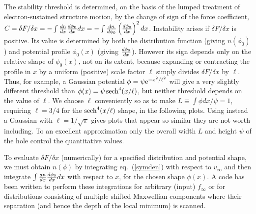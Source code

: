 \documentclass[pre]{revtex4-2}
\begin{document}
The stability threshold is determined, on the basis of the lumped
treatment of electron-sustained structure motion, by the change of sign
of the force coefficient,
$C=\delta F/\delta x=-\int{dn\over dx}{d\phi_0\over dx} dx = -\int
{dn\over d\phi_0}\left(d\phi_0\over dx\right)^2 dx$. Instability
arises if $\delta F/\delta x$ is positive. Its value is determined by
both the distribution function (giving $n(\phi_0)$) and potential
profile $\phi_0(x)$ (giving ${d\phi_0\over dx}$). However its sign
depends only on the relative shape of $\phi_0(x)$, not on its extent,
because expanding or contracting the profile in $x$ by a uniform
(positive) scale factor $\ell$ simply divides $\delta F/\delta x$ by
$\ell$.  Thus, for example, a Gaussian potential
$\phi=\psi {\rm e}^{-x^2/\ell^2}$ will give a very slightly different
threshold than $\phi(x)=\psi\, {\rm sech}^4(x/\ell)$, but neither
threshold depends on the value of $\ell$. We choose $\ell$ conveniently so
as to make $L\equiv\int \phi dx/\psi=1$, requiring $\ell=3/4$ for the
${\rm sech}^4(x/\ell)$ shape, in the following plots. Using instead a Gaussian
with $\ell=1/\sqrt{\pi}$ gives plots that appear so similar they are
not worth including. To an excellent approximation only the overall
width $L$ and height $\psi$ of the hole control the quantitative values.

To evaluate $\delta F/\delta x$ (numerically) for a specified distribution and
potential shape, we must obtain $n(\phi)$ by integrating eq.\
(\ref{symden}) with respect to $v_\infty$ and then integrate
$\int{dn\over dx}{d\phi_0\over dx} dx$ with respect to $x$, for the
chosen shape $\phi(x)$. A code has been written to perform these
integrations for arbitrary (input) $f_\infty$ or for distributions
consisting of multiple shifted Maxwellian components where
their separation (and hence the depth of the local minimum) is scanned. 
\end{document}
